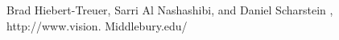 \documentclass{singlecol-new}
\theoremstyle{TH}{
\newtheorem{lemma}{Lemma}
\newtheorem{theorem}[lemma]{Theorem}
\newtheorem{corrolary}[lemma]{Corrolary}
\newtheorem{conjecture}[lemma]{Conjecture}
\newtheorem{proposition}[lemma]{Proposition}
\newtheorem{claim}[lemma]{Claim}
\newtheorem{stheorem}[lemma]{Wrong Theorem}
\newtheorem{algorithm}{Algorithm}
}
\theoremstyle{THrm}{
\newtheorem{definition}{Definition}[section]
\newtheorem{question}{Question}[section]
\newtheorem{remark}{Remark}
\newtheorem{scheme}{Scheme}
}
\theoremstyle{THhit}{
\newtheorem{case}{Case}[section]
}
\begin{document}
\begin{thebibliography}{10}
Brad Hiebert-Treuer, Sarri Al Nashashibi, and Daniel Scharstein  , http://www.vision. Middlebury.edu/


\end{thebibliography}
\end{document}
